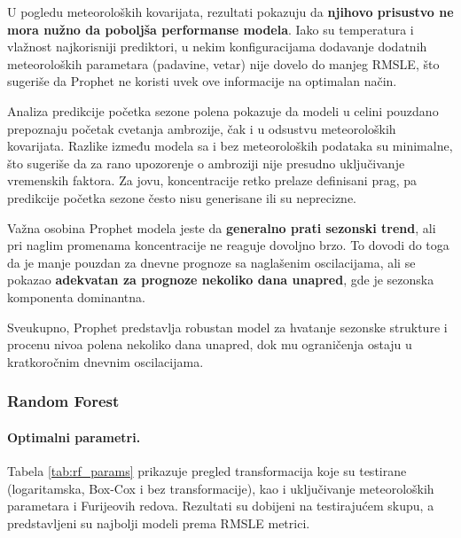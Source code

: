 \documentclass[12pt]{article}
\begin{document}
U pogledu meteoroloških kovarijata, rezultati pokazuju da \textbf{njihovo prisustvo ne mora nužno da poboljša performanse modela}. Iako su temperatura i vlažnost najkorisniji prediktori, u nekim konfiguracijama dodavanje dodatnih meteoroloških parametara (padavine, vetar) nije dovelo do manjeg RMSLE, što sugeriše da Prophet ne koristi uvek ove informacije na optimalan način.  

Analiza predikcije početka sezone polena pokazuje da modeli u celini pouzdano prepoznaju početak cvetanja ambrozije, čak i u odsustvu meteoroloških kovarijata. Razlike između modela sa i bez meteoroloških podataka su minimalne, što sugeriše da za rano upozorenje o ambroziji nije presudno uključivanje vremenskih faktora. Za jovu, koncentracije retko prelaze definisani prag, pa predikcije početka sezone često nisu generisane ili su neprecizne.  

Važna osobina Prophet modela jeste da \textbf{generalno prati sezonski trend}, ali pri naglim promenama koncentracije ne reaguje dovoljno brzo. To dovodi do toga da je manje pouzdan za dnevne prognoze sa naglašenim oscilacijama, ali se pokazao \textbf{adekvatan za prognoze nekoliko dana unapred}, gde je sezonska komponenta dominantna.  

Sveukupno, Prophet predstavlja robustan model za hvatanje sezonske strukture i procenu nivoa polena nekoliko dana unapred, dok mu ograničenja ostaju u kratkoročnim dnevnim oscilacijama.




\subsubsection{Random Forest}

\paragraph{\textbf{Optimalni parametri.}}
Tabela \ref{tab:rf_params} prikazuje pregled transformacija koje su testirane (logaritamska, Box-Cox i bez transformacije), kao i uključivanje meteoroloških parametara i Furijeovih redova. Rezultati su dobijeni na testirajućem skupu, a predstavljeni su najbolji modeli prema RMSLE metrici.
\end{document}
